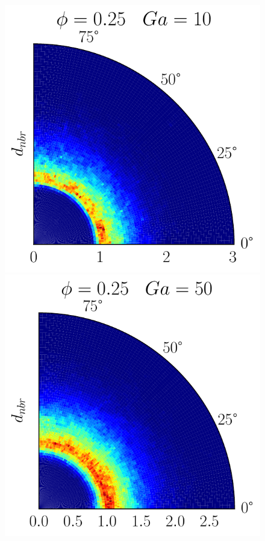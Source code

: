 \begin{figure}[h!]
    \includegraphics[height =\size]{image/N_10/beta/2DMAP_theta_distmin_dmin_10_Bo1PHI0_25mu_r0_42Ga10.pdf}
    \includegraphics[height =\size]{image/N_10/beta/2DMAP_theta_distmin_dmin_10_Bo1PHI0_25mu_r0_42Ga50.pdf}

\end{figure}
